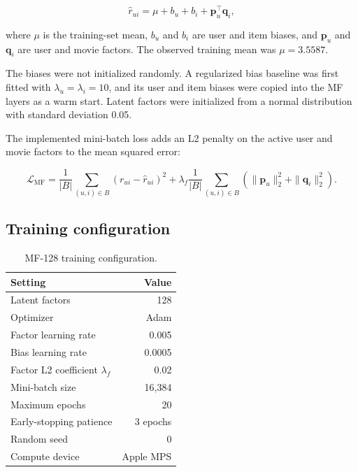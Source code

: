 \documentclass[11pt,a4paper]{article}
\begin{document}
\begin{equation}
\hat r_{ui} = \mu + b_u + b_i + \mathbf{p}_u^\top\mathbf{q}_i,
\end{equation}

where $\mu$ is the training-set mean, $b_u$ and $b_i$ are user and item biases, and $\mathbf p_u$ and $\mathbf q_i$ are user and movie factors. The observed training mean was $\mu=3.5587$.

The biases were not initialized randomly. A regularized bias baseline was first fitted with $\lambda_u=\lambda_i=10$, and its user and item biases were copied into the MF layers as a warm start. Latent factors were initialized from a normal distribution with standard deviation 0.05.

The implemented mini-batch loss adds an L2 penalty on the active user and movie factors to the mean squared error:

\begin{equation}
\mathcal{L}_{\mathrm{MF}} = \frac{1}{|B|}\sum_{(u,i)\in B}(r_{ui}-\hat r_{ui})^2
+ \lambda_f\frac{1}{|B|}\sum_{(u,i)\in B}
\left(\|\mathbf p_u\|_2^2+\|\mathbf q_i\|_2^2\right).
\end{equation}

\subsection{Training configuration}

\begin{table}[H]
\centering
\caption{MF-128 training configuration.}
\label{tab:mfconfig}
\begin{tabularx}{0.82\textwidth}{@{}Y r@{}}
\toprule
\textbf{Setting} & \textbf{Value} \\
\midrule
Latent factors & 128 \\
Optimizer & Adam \\
Factor learning rate & 0.005 \\
Bias learning rate & 0.0005 \\
Factor L2 coefficient $\lambda_f$ & 0.02 \\
Mini-batch size & 16,384 \\
Maximum epochs & 20 \\
Early-stopping patience & 3 epochs \\
Random seed & 0 \\
Compute device & Apple MPS \\
\bottomrule
\end{tabularx}
\end{table}
\end{document}
